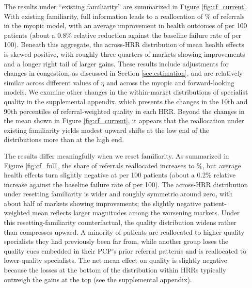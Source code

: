 \documentclass[12pt]{article}
\begin{document}
The results under ``existing familiarity'' are summarized in Figure \ref{fig:cf_current}. With existing familiarity, full information leads to a reallocation of \reallocationMeanCurrentEtaFiveMyopic{}\% of referrals in the myopic model, with an average improvement in health outcomes of \healthFXMeanCurrentEtaFiveMyopic{} per 100 patients (about a 0.8\% relative reduction against the baseline failure rate of \failureRateMean{} per 100).
Beneath this aggregate, the across-HRR distribution of mean health effects is skewed positive, with roughly three-quarters of markets showing improvements and a longer right tail of larger gains.
These results include adjustments for changes in congestion, as discussed in Section \ref{sec:estimation}, and are relatively similar across different values of $\eta$ and across the myopic and forward-looking models. 
We examine other changes in the within-market distributions of specialist quality in the supplemental appendix, which presents the changes in the 10th and 90th percentiles of referral-weighted quality in each HRR. Beyond the changes in the mean shown in Figure \ref{fig:cf_current}, it appears that the reallocation under existing familiarity yields modest upward shifts at the low end of the distributions more than at the high end.

The results differ meaningfully when we reset familiarity. As summarized in Figure \ref{fig:cf_full}, the share of referrals reallocated increases to \reallocationMeanMyopic{}\%, but average health effects turn slightly negative at \healthFXMeanMyopic{} per 100 patients (about a 0.2\% relative increase against the baseline failure rate of \failureRateMean{} per 100). The across-HRR distribution under resetting familiarity is wider and roughly symmetric around zero, with about half of markets showing improvements; the slightly negative patient-weighted mean reflects larger magnitudes among the worsening markets. Under this resetting-familiarity counterfactual, the quality distribution widens rather than compresses upward. A minority of patients are reallocated to higher-quality specialists they had previously been far from, while another group loses the quality cues embedded in their PCP's prior referral patterns and is reallocated to lower-quality specialists. The net mean effect on quality is slightly negative because the losses at the bottom of the distribution within HRRs typically outweigh the gains at the top (see the supplemental appendix).
\end{document}
